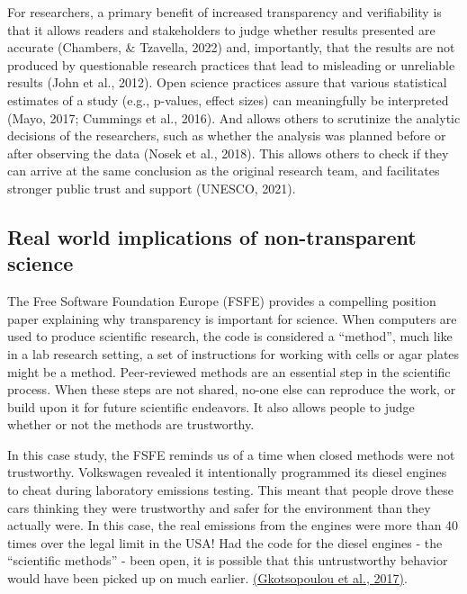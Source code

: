 \documentclass[
  letterpaper,
  DIV=11,
  numbers=noendperiod]{scrreport}
\begin{document}
For researchers, a primary benefit of increased transparency and
verifiability is that it allows readers and stakeholders to judge
whether results presented are accurate (Chambers, \& Tzavella, 2022)
and, importantly, that the results are not produced by questionable
research practices that lead to misleading or unreliable results (John
et al., 2012). Open science practices assure that various statistical
estimates of a study (e.g., p-values, effect sizes) can meaningfully be
interpreted (Mayo, 2017; Cummings et al., 2016). And allows others to
scrutinize the analytic decisions of the researchers, such as whether
the analysis was planned before or after observing the data (Nosek et
al., 2018). This allows others to check if they can arrive at the same
conclusion as the original research team, and facilitates stronger
public trust and support (UNESCO, 2021).

\hypertarget{real-world-implications-of-non-transparent-science}{%
\subsection{Real world implications of non-transparent
science}\label{real-world-implications-of-non-transparent-science}}

The Free Software Foundation Europe (FSFE) provides a compelling
position paper explaining why transparency is important for science.
When computers are used to produce scientific research, the code is
considered a ``method'', much like in a lab research setting, a set of
instructions for working with cells or agar plates might be a method.
Peer-reviewed methods are an essential step in the scientific process.
When these steps are not shared, no-one else can reproduce the work, or
build upon it for future scientific endeavors. It also allows people to
judge whether or not the methods are trustworthy.

In this case study, the FSFE reminds us of a time when closed methods
were not trustworthy. Volkswagen revealed it intentionally programmed
its diesel engines to cheat during laboratory emissions testing. This
meant that people drove these cars thinking they were trustworthy and
safer for the environment than they actually were. In this case, the
real emissions from the engines were more than 40 times over the legal
limit in the USA! Had the code for the diesel engines - the ``scientific
methods'' - been open, it is possible that this untrustworthy behavior
would have been picked up on much earlier.
\href{https://download.fsfe.org/policy/letters/20170105-horizon2020-position-paper.pdf}{(Gkotsopoulou
et al., 2017)}.
\end{document}
